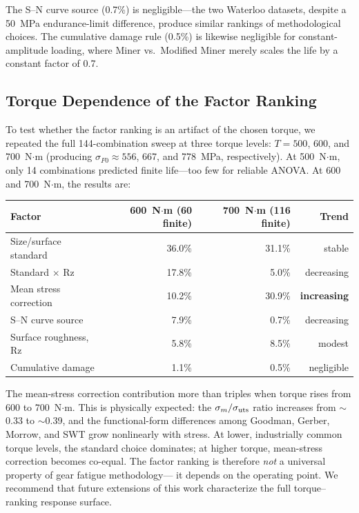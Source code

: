 \documentclass[12pt,a4paper]{article}
\begin{document}
The S--N curve source (0.7\%) is negligible---the two Waterloo datasets,
despite a 50~MPa endurance-limit difference, produce similar rankings of
methodological choices. The cumulative damage rule (0.5\%) is likewise
negligible for constant-amplitude loading, where Miner vs.\ Modified
Miner merely scales the life by a constant factor of 0.7.

\subsection{Torque Dependence of the Factor Ranking}
\label{sec:torque}

To test whether the factor ranking is an artifact of the chosen torque,
we repeated the full 144-combination sweep at three torque levels:
$T = 500$, 600, and 700~N$\cdot$m (producing $\sigma_{F0} \approx 556$,
667, and 778~MPa, respectively). At 500~N$\cdot$m, only 14 combinations
predicted finite life---too few for reliable ANOVA. At 600 and
700~N$\cdot$m, the results are:

\vspace{4pt}
\noindent\begin{tabular}{lrrr}
\toprule
Factor & 600~N$\cdot$m (60 finite) & 700~N$\cdot$m (116 finite) & Trend \\
\midrule
Size/surface standard & 36.0\% & 31.1\% & stable \\
Standard $\times$ Rz & 17.8\% & 5.0\% & decreasing \\
Mean stress correction & 10.2\% & 30.9\% & \textbf{increasing} \\
S--N curve source & 7.9\% & 0.7\% & decreasing \\
Surface roughness, Rz & 5.8\% & 8.5\% & modest \\
Cumulative damage & 1.1\% & 0.5\% & negligible \\
\bottomrule
\end{tabular}
\vspace{4pt}

The mean-stress correction contribution more than triples when torque
rises from 600 to 700~N$\cdot$m. This is physically expected: the
$\sigma_m/\sigma_{\rm uts}$ ratio increases from $\sim$0.33 to
$\sim$0.39, and the functional-form differences among Goodman, Gerber,
Morrow, and SWT grow nonlinearly with stress. At lower, industrially
common torque levels, the standard choice dominates; at higher torque,
mean-stress correction becomes co-equal. The factor ranking is
therefore \emph{not} a universal property of gear fatigue methodology---
it depends on the operating point. We recommend that future extensions
of this work characterize the full torque--ranking response surface.
\end{document}
